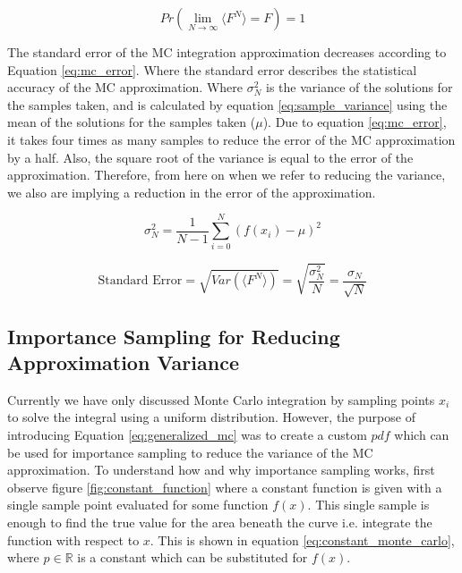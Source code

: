 \documentclass[../dissertation.tex]{subfiles}
\begin{document}
\begin{equation}
\label{eq:law_large_numbers}
Pr( \lim_{N \rightarrow \infty} \langle F^N \rangle = F ) = 1
\end{equation}

The standard error of the MC integration approximation decreases according to Equation \ref{eq:mc_error}. Where the standard error describes the statistical accuracy of the MC approximation. Where $\sigma_N^2$ is the variance of the solutions for the samples taken, and is calculated by equation \ref{eq:sample_variance} using the mean of the solutions for the samples taken ($\mu$). Due to equation \ref{eq:mc_error}, it takes four times as many samples to reduce the error of the MC approximation by a half. Also, the square root of the variance is equal to the error of the approximation. Therefore, from here on when we refer to reducing the variance, we also are implying a reduction in the error of the approximation.

\begin{equation}
\label{eq:sample_variance}
\sigma_N^2 = \frac{1}{N-1} \sum_{i=0}^N (f(x_i) - \mu)^2
\end{equation}

\begin{equation}
\label{eq:mc_error}
\text{Standard Error} = \sqrt{Var(\langle F^N \rangle)} = \sqrt{\frac{\sigma_N^2}{N}} = \frac{\sigma_N}{\sqrt{N}}
\end{equation}

\subsection{Importance Sampling for Reducing Approximation Variance}
\label{sec:importance_sampling}

Currently we have only discussed Monte Carlo integration by sampling points $x_i$ to solve the integral using a uniform distribution. However, the purpose of introducing Equation \ref{eq:generalized_mc} was to create a custom $pdf$ which can be used for importance sampling to reduce the variance of the MC approximation. To understand how and why importance sampling works, first observe figure \ref{fig:constant_function} where a constant function is given with a single sample point evaluated for some function $f(x)$. This single sample is enough to find the true value for the area beneath the curve i.e. integrate the function with respect to $x$. This is shown in equation \ref{eq:constant_monte_carlo}, where $p \in \mathbb{R}$ is a constant which can be substituted for $f(x)$.
\end{document}

